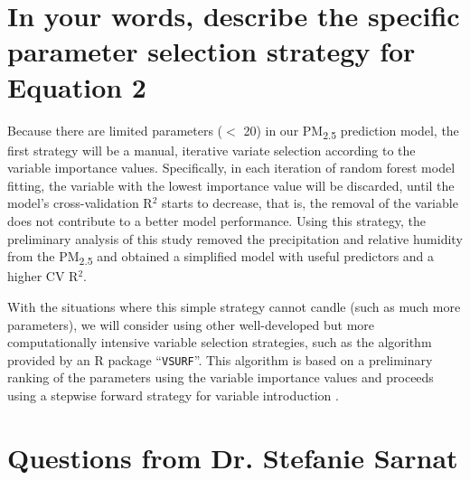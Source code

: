 \documentclass[11pt]{article}
\newcommand{\tsub}{\textsubscript}
\begin{document}
\section{In your words, describe the specific parameter selection strategy for Equation 2}
\begin{enumerate*}[{[1)]}]
    \item Because there are limited parameters ($<$ 20) in our PM\tsub{2.5} prediction model, the first strategy will be a manual, iterative variate selection according to the variable importance values. Specifically, in each iteration of random forest model fitting, the variable with the lowest importance value will be discarded, until the model's cross-validation R$^2$ starts to decrease, that is, the removal of the variable does not contribute to a better model performance. Using this strategy, the preliminary analysis of this study removed the precipitation and relative humidity from the PM\tsub{2.5} and obtained a simplified model with useful predictors and a higher CV R$^2$. 
    \item With the situations where this simple strategy cannot candle (such as much more parameters), we will consider using other well-developed but more computationally intensive variable selection strategies, such as the algorithm provided by an R package ``\texttt{VSURF}''. This algorithm is based on a preliminary ranking of the parameters using the variable importance values and proceeds using a stepwise forward strategy for variable introduction \citep{genuer2015vsurf}.
\end{enumerate*}



\hdashrule{\textwidth}{0.1pt}{3mm 3pt 1mm 3pt}
\setcounter{section}{0}

\section*{Questions from Dr. Stefanie Sarnat}
\end{document}

